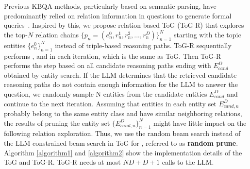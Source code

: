 \documentclass{article} %
\begin{document}
Previous KBQA methods, particularly based on semantic parsing, have predominantly relied on relation information in questions to generate formal queries~\citep{complexKBQA}. Inspired by this, we propose relation-based ToG (ToG-R) that explores the top-$N$ relation chains $\{p_n = (e^{0}_n,r^{1}_n,r^{2}_n,...,r^{D}_n)\}^N_{n=1}$ starting with the topic entities $\{e^{0}_n\}^N_{n=1}$ instead of triple-based reasoning paths. ToG-R sequentially performs ,  and  in each iteration, which is the same as ToG. Then ToG-R performs the  step based on all candidate reasoning paths ending with $E^{D}_{cand}$ obtained by entity search. If the LLM determines that the retrieved candidate reasoning paths do not contain enough information for the LLM to answer the question, we randomly sample N entities from the candidate entities $E^{D}_{cand}$ and continue to the next iteration. Assuming that entities in each entity set $E^{D}_{cand,n}$ probably belong to the same entity class and have similar neighboring relations, the results of pruning the entity set $\{E^{D}_{cand,n}\}^N_{n=1}$ might have little impact on the following relation exploration. Thus, we use the random beam search instead of the LLM-constrained beam search in ToG for , referred to as \textbf{random prune}. Algorithm \ref{algorithm1} and \ref{algorithm2} show the implementation details of the ToG and ToG-R. ToG-R needs at most $ND+D+1$ calls to the LLM.
\end{document}
